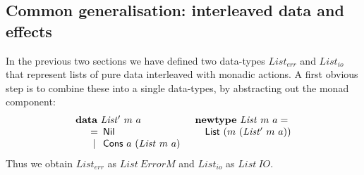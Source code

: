 \documentclass{jfp1}
\newcommand{\kw}[1]{\textbf{#1}}
\begin{document}


\subsection{Common generalisation: interleaved data and effects}

In the previous two sections we have defined two data-types
$\mathit{List_{err}}$ and $\mathit{List_{io}}$ that represent lists of
pure data interleaved with monadic actions. A first obvious step is to
combine these into a single data-types, by abstracting out the monad
component:
\begin{displaymath}
  \begin{array}{ll}
    \kw{data}~\mathit{List'}~m~a
    &
    \kw{newtype}~\mathit{List}~m~a = 
    \\
    \quad
    \begin{array}[t]{c@{\hspace{0.5em}}l}
      = & \mathsf{Nil} \\
      | & \mathsf{Cons}~a~(\mathit{List}~m~a) \\
    \end{array}
    &
    \quad \mathsf{List}~(m~(\mathit{List'}~m~a))
  \end{array}
\end{displaymath}
Thus we obtain $\mathit{List_{err}}$ as
$\mathit{List}~\mathit{ErrorM}$ and $\mathit{List_{io}}$ as
$\mathit{List}~\mathit{IO}$.
\end{document}
